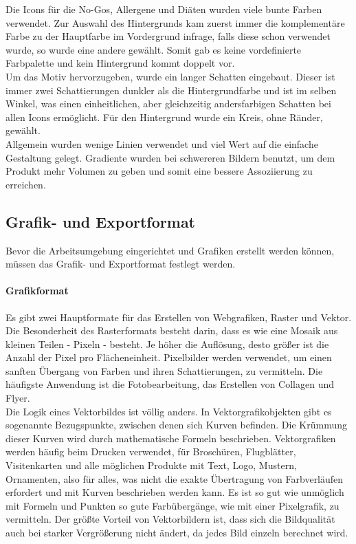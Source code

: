 Die Icons für die No-Gos, Allergene und Diäten wurden viele bunte Farben verwendet. Zur Auswahl des Hintergrunds kam zuerst immer die komplementäre Farbe zu der Hauptfarbe im Vordergrund infrage, falls diese schon verwendet wurde, so wurde eine andere gewählt. Somit gab es keine vordefinierte Farbpalette und kein Hintergrund kommt doppelt vor. \\
Um das Motiv hervorzugeben, wurde ein langer Schatten eingebaut. Dieser ist immer zwei Schattierungen dunkler als die Hintergrundfarbe und ist im selben Winkel, was einen einheitlichen, aber gleichzeitig andersfarbigen Schatten bei allen Icons ermöglicht. Für den Hintergrund wurde ein Kreis, ohne Ränder, gewählt. \\
Allgemein wurden wenige Linien verwendet und viel Wert auf die einfache Gestaltung gelegt. Gradiente wurden bei schwereren Bildern benutzt, um dem Produkt mehr Volumen zu geben und somit eine bessere Assoziierung zu erreichen. 

\subsection{Grafik- und Exportformat}
Bevor die Arbeitsumgebung eingerichtet und Grafiken erstellt werden können, müssen das Grafik- und Exportformat festlegt werden.


\paragraph{Grafikformat}
Es gibt zwei Hauptformate für das Erstellen von Webgrafiken, Raster und Vektor. Die Besonderheit des Rasterformats besteht darin, dass es wie eine Mosaik aus kleinen Teilen - Pixeln - besteht. Je höher die Auflösung, desto größer ist die Anzahl der Pixel pro Flächeneinheit. Pixelbilder werden verwendet, um einen sanften Übergang von Farben und ihren Schattierungen, zu vermitteln. Die häufigste Anwendung ist die Fotobearbeitung, das Erstellen von Collagen und Flyer.\\


Die Logik eines Vektorbildes ist völlig anders. In Vektorgrafikobjekten gibt es sogenannte Bezugspunkte, zwischen denen sich Kurven befinden. Die Krümmung dieser Kurven wird durch mathematische Formeln beschrieben. Vektorgrafiken werden häufig beim Drucken verwendet, für Broschüren, Flugblätter, Visitenkarten und alle möglichen Produkte mit Text, Logo, Mustern, Ornamenten, also für alles, was nicht die exakte Übertragung von Farbverläufen erfordert und mit Kurven beschrieben werden kann. Es ist so gut wie unmöglich mit Formeln und Punkten so gute Farbübergänge, wie mit einer Pixelgrafik, zu vermitteln. Der größte Vorteil von Vektorbildern ist, dass sich die Bildqualität auch bei starker Vergrößerung nicht ändert, da jedes Bild einzeln berechnet wird.\\

